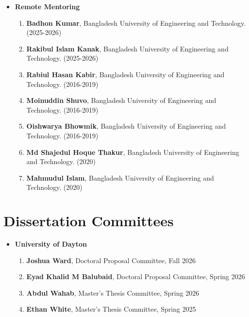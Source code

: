 \documentclass[11pt, letterpaper]{article}
\begin{document}
\begin{itemize}[itemsep=-1pt, topsep=2pt]
\begin{enumerate}
            \item \textbf{Satyajit Mojumder}, Graduate Student, Northwestern University. (2021-2023)
            \item \textbf{Sourav Saha}, Graduate Student, Northwestern University. (2021-2023)
            \item \textbf{Hengyang Li}, Graduate Student, Northwestern University. (2021-2023)
            \item \textbf{Yangfan Li}, Graduate Student, Northwestern University. (2021-2023)
        \end{enumerate}
        \item \textbf{Remote Mentoring}
        \begin{enumerate}
            \item \textbf{Badhon Kumar}, Bangladesh University of Engineering and Technology. (2025-2026)
            \item \textbf{Rakibul Islam Kanak}, Bangladesh University of Engineering and Technology. (2025-2026)
            \item \textbf{Rabiul Hasan Kabir}, Bangladesh University of Engineering and Technology. (2016-2019)
            \item \textbf{Moinuddin Shuvo}, Bangladesh University of Engineering and Technology. (2016-2019)
            \item \textbf{Oishwarya Bhowmik}, Bangladesh University of Engineering and Technology. (2016-2019)
            \item \textbf{Md Shajedul Hoque Thakur}, Bangladesh University of Engineering and Technology. (2020)
            \item \textbf{Mahmudul Islam}, Bangladesh University of Engineering and Technology. (2020)
        \end{enumerate}
    \end{itemize}

\section{Dissertation Committees}
    \begin{itemize}[itemsep=-1pt, topsep=2pt]
        \item \textbf{University of Dayton}
        \begin{enumerate}[label=\arabic*., itemsep=-1pt, topsep=2pt]
            \item \textbf{Joshua Ward}, Doctoral Proposal Committee, Fall 2026
            \item \textbf{Eyad Khalid M Balubaid}, Doctoral Proposal Committee, Spring 2026
            \item \textbf{Abdul Wahab}, Master's Thesis Committee, Spring 2026
            \item \textbf{Ethan White}, Master's Thesis Committee, Spring 2025
        \end{enumerate}
    \end{itemize}
\end{document}
